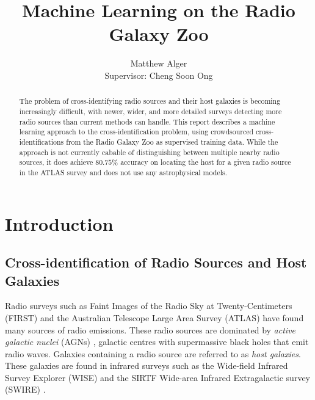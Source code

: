 \documentclass[a4paper]{article}
\begin{document}



  \title{Machine Learning on the Radio Galaxy Zoo}

  \author{Matthew Alger \\ Supervisor: Cheng Soon Ong}

  \maketitle

  \begin{abstract}
    The problem of cross-identifying radio sources and their host galaxies is becoming increasingly difficult, with newer, wider, and more detailed surveys detecting more radio sources than current methods can handle. This report describes a machine learning approach to the cross-identification problem, using crowdsourced cross-identifications from the Radio Galaxy Zoo as supervised training data. While the approach is not currently cabable of distinguishing between multiple nearby radio sources, it does achieve $80.75\%$ accuracy on locating the host for a given radio source in the ATLAS survey and does not use any astrophysical models.
  \end{abstract}

  \section{Introduction}

    \subsection{Cross-identification of Radio Sources and Host Galaxies}

      Radio surveys such as Faint Images of the Radio Sky at Twenty-Centimeters (FIRST) \cite{white97,becker95} and the Australian Telescope Large Area Survey (ATLAS) \cite{franzen15} have found many sources of radio emissions. These radio sources are dominated by \emph{active galactic nuclei} (AGNs) \cite{banfield15}, galactic centres with supermassive black holes that emit radio waves\cite{peterson97}. Galaxies containing a radio source are referred to as \emph{host galaxies}. These galaxies are found in infrared surveys such as the Wide-field Infrared Survey Explorer (WISE) \cite{wright10} and the SIRTF Wide-area Infrared Extragalactic survey (SWIRE) \cite{surace05,lonsdale03}.
\end{document}

